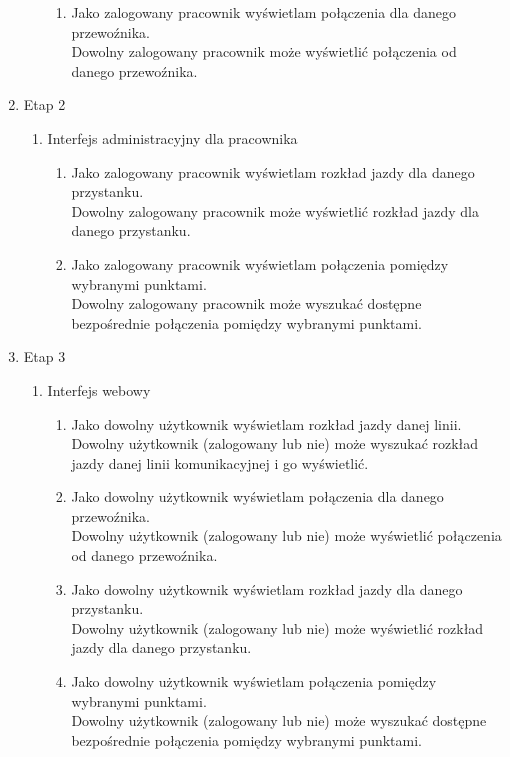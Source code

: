 \documentclass[10pt,a4paper]{article}
\begin{document}
\begin{enumerate}
\begin{enumerate}[label*=\arabic*.]
\begin{enumerate}[label*=\arabic*.]
	    	\item Jako zalogowany pracownik wyświetlam połączenia dla danego przewoźnika. \\
			    Dowolny zalogowany pracownik może wyświetlić połączenia od danego przewoźnika.
		\end{enumerate}
	\end{enumerate}
	\item Etap 2
	\begin{enumerate}[label*=\arabic*.]
		\item Interfejs administracyjny dla pracownika
		\begin{enumerate}[label*=\arabic*.]
			\mdseries
		 	\item Jako zalogowany pracownik wyświetlam rozkład jazdy dla danego przystanku. \\
			    Dowolny zalogowany pracownik może wyświetlić rozkład jazdy dla danego przystanku.
		 	\item Jako zalogowany pracownik wyświetlam połączenia pomiędzy wybranymi punktami. \\
			    Dowolny zalogowany pracownik może wyszukać dostępne bezpośrednie połączenia pomiędzy wybranymi punktami. 
		\end{enumerate}
	\end{enumerate}
	\item Etap 3
	\begin{enumerate}[label*=\arabic*.]
		\item Interfejs webowy
		\begin{enumerate}[label*=\arabic*.]
			\mdseries
		 	\item Jako dowolny użytkownik wyświetlam rozkład jazdy danej linii. \\
			    Dowolny użytkownik (zalogowany lub nie) może wyszukać rozkład jazdy danej linii
			    komunikacyjnej i go wyświetlić.
	    	\item Jako dowolny użytkownik wyświetlam połączenia dla danego przewoźnika. \\
			    Dowolny użytkownik (zalogowany lub nie) może wyświetlić połączenia od danego przewoźnika.
		 	\item Jako dowolny użytkownik wyświetlam rozkład jazdy dla danego przystanku. \\
			    Dowolny użytkownik (zalogowany lub nie) może wyświetlić rozkład jazdy dla danego przystanku.
		 	\item Jako dowolny użytkownik wyświetlam połączenia pomiędzy wybranymi punktami. \\
			    Dowolny użytkownik (zalogowany lub nie) może wyszukać dostępne bezpośrednie połączenia pomiędzy wybranymi punktami.

\end{enumerate}
\end{enumerate}
\end{enumerate}
\end{document}
